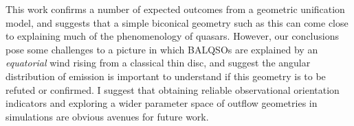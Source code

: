 This work confirms a number of expected outcomes from a geometric unification 
model, and suggests that a simple biconical geometry such as this can come close to 
explaining much of the  phenomenology of quasars. However, our conclusions pose 
some challenges to a picture in which BALQSOs are
explained by an {\em equatorial} wind rising from a classical thin disc, and suggest 
the angular distribution of emission is important to understand if this 
geometry is to be refuted or confirmed. I suggest that obtaining reliable 
observational orientation indicators and 
exploring a wider parameter space of outflow geometries in simulations
are obvious avenues for future work.